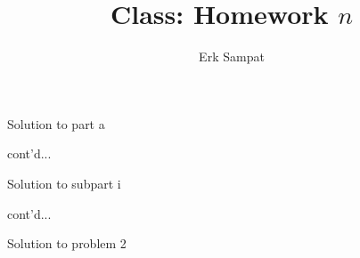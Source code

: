 \title{{\selectfont Class: } Homework $n$}
\author{Erk Sampat}



\maketitle
\prob
\begin{pp}
	Solution to part a
	
	cont'd...
\end{pp}
\begin{pp}
	\begin{spart}
		Solution to subpart i
		
		cont'd...
	\end{spart}
\end{pp}
\prob
Solution to problem 2

